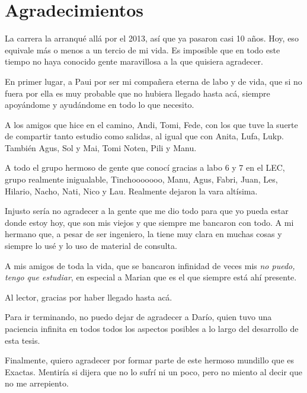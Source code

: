\singlespace
\chapter*{Agradecimientos}
\noindent La carrera la arranqué allá por el 2013, así que ya pasaron casi 10 años. Hoy, eso equivale más o menos a un tercio de mi vida.
Es imposible que en todo este tiempo no haya conocido gente maravillosa a la que quisiera agradecer. 

En primer lugar, a Paui por ser mi compañera eterna de labo y de vida, que si no fuera por ella es muy probable que no hubiera llegado hasta acá, siempre apoyándome y ayudándome en todo lo que necesito.

A los amigos que hice en el camino, Andi, Tomi, Fede, con los que tuve la suerte de compartir tanto estudio como salidas, al igual que con Anita, Lufa, Lukp. También Agus, Sol y Mai, Tomi Noten, Pili y Manu.

A todo el grupo hermoso de gente que conocí gracias a labo 6 y 7 en el LEC, grupo realmente inigualable, Tinchooooooo, Manu, Agus, Fabri, Juan, Les, Hilario, Nacho, Nati, Nico y Lau. Realmente dejaron la vara altísima.

Injusto sería no agradecer a la gente que me dio todo para que yo pueda estar donde estoy hoy, que son mis viejos y que siempre me bancaron con todo. A mi hermano que, a pesar de ser ingeniero, la tiene muy clara en muchas cosas y siempre lo usé y lo uso de material de consulta.

A mis amigos de toda la vida, que se bancaron infinidad de veces mis \textit{no puedo, tengo que estudiar}, en especial a Marian que es el que siempre está ahí presente.

Al lector, gracias por haber llegado hasta acá.

Para ir terminando, no puedo dejar de agradecer a Darío, quien tuvo una paciencia infinita en todos todos los aspectos posibles a lo largo del desarrollo de esta tesis.

Finalmente, quiero agradecer por formar parte de este hermoso mundillo que es Exactas. Mentiría si dijera que no lo sufrí ni un poco, pero no miento al decir que no me arrepiento.